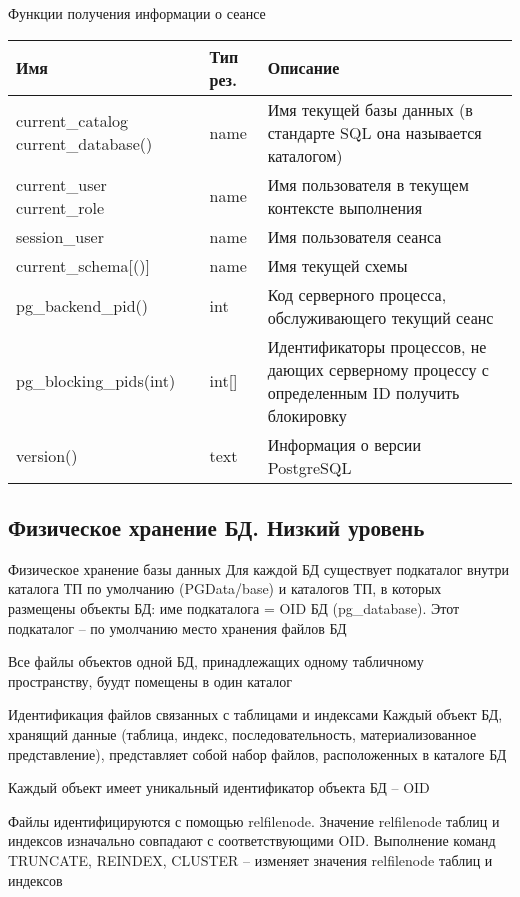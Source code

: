 \documentclass[12pt]{article}
\begin{document}
\begin{nota}{Функции получения информации о сеансе}
    \begin{center}
        \begin{tabular}{|m{10em}|m{4em}|m{20em}|}
            \hline 
            Имя & Тип рез. & Описание \\
            \hline 
            current\_catalog current\_database() & name & Имя текущей базы данных (в стандарте SQL она называется каталогом) \\
            \hline 
            current\_user current\_role & name & Имя пользователя в текущем контексте выполнения \\
            \hline 
            session\_user & name & Имя пользователя сеанса \\
            \hline 
            current\_schema[()] & name & Имя текущей схемы \\
            \hline 
            pg\_backend\_pid() & int & Код серверного процесса, обслуживающего текущий сеанс \\
            \hline 
            pg\_blocking\_pids(int) & int[] & Идентификаторы процессов, не дающих серверному процессу с определенным ID получить блокировку \\
            \hline 
            version() & text & Информация о версии PostgreSQL \\
            \hline
        \end{tabular}
    \end{center}
\end{nota}

\newpage 

\subsection{Физическое хранение БД. Низкий уровень}

\begin{nota}{Физическое хранение базы данных}
    Для каждой БД существует подкаталог внутри каталога ТП по умолчанию (PGData/base) и каталогов ТП, в которых размещены объекты БД: име подкаталога = OID БД (pg\_database). Этот подкаталог -- по умолчанию место хранения файлов БД 

    Все файлы объектов одной БД, принадлежащих одному табличному пространству, буудт помещены в один каталог
\end{nota}

\begin{nota}{Идентификация файлов связанных с таблицами и индексами}
    Каждый объект БД, хранящий данные (таблица, индекс, последовательность, материализованное представление), представляет собой набор файлов, расположенных в каталоге БД 

    Каждый объект имеет уникальный идентификатор объекта БД -- OID
    
    Файлы идентифицируются с помощью relfilenode. Значение relfilenode таблиц и индексов изначально совпадают с соответствующими OID. Выполнение команд TRUNCATE, REINDEX, CLUSTER -- изменяет значения relfilenode таблиц и индексов
\end{nota}
\end{document}
